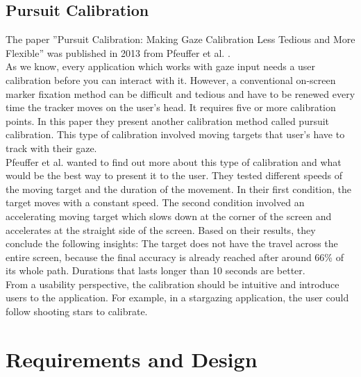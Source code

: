 \documentclass{sigchi}
\begin{document}
\subsection{Pursuit Calibration}
The paper ''Pursuit Calibration: Making Gaze Calibration Less Tedious and More Flexible'' was published in 2013 from Pfeuffer et al.  \cite{pfeuffer2013pursuit}.\\
As we know, every application which works with gaze input needs a user calibration before you can interact with it. However, a conventional on-screen marker fixation method can be difficult and tedious and have to be renewed every time the tracker moves on the user's head. It requires five or more calibration points. In this paper they present another calibration method called pursuit calibration. This type of calibration involved moving targets that user's have to track with their gaze.\\
Pfeuffer et al. wanted to find out more about this type of calibration and what would be the best way to present it to the user. They tested different speeds of the moving target and the duration of the movement. In their first condition, the target moves with a constant speed. The second condition involved an accelerating moving target which slows down at the corner of the screen and accelerates at the straight side of the screen. Based on their results, they conclude the following insights: The target does not have the travel across the entire screen, because the final accuracy is already reached after around 66\% of its whole path. Durations that lasts longer than 10 seconds are better.\\
From a usability perspective, the calibration should be intuitive and introduce users to the application. For example, in a stargazing application, the user could follow shooting stars to calibrate.

\section{Requirements and Design}
\end{document}
